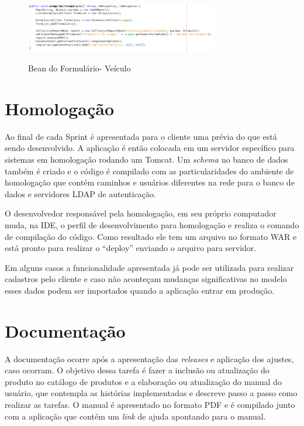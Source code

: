 \begin{figure}[!htb]
    \centering
    \caption{Bean do Formulário- Veículo}
    \includegraphics[width=0.75\textwidth]{dados/figuras/veiculos-jasperreports.png}
    \label{fig:figura-jasperreports}
\end{figure}


\section{Homologação}
\label{sec:atividadesRealizadasHomologacao}

Ao final de cada Sprint é apresentada para o cliente uma prévia do que está sendo desenvolvido. A aplicação é então colocada em um servidor específico para sistemas em homologação rodando um Tomcat. Um \textit{schema} no banco de dados também é criado e o código é compilado com as particularidades do ambiente de homologação que contém caminhos e usuários diferentes na rede para o banco de dados e servidores LDAP de autenticação. 

O desenvolvedor responsável pela homologação, em seu próprio computador muda, na IDE, o perfil de desenvolvimento para homologação e realiza o comando de compilação do código. Como resultado ele tem um arquivo no formato WAR e está pronto para realizar o ``deploy'' enviando o arquivo para servidor.

Em alguns casos a funcionalidade apresentada já pode ser utilizada para realizar cadastros pelo cliente e caso não aconteçam mudanças significativas no modelo esses dados podem ser importados quando a aplicação entrar em produção. 



\section{Documentação}
\label{sec:atividadesRealizadasDocumentacao}

A documentação ocorre após a apresentação das \textit{releases} e aplicação dos ajustes, caso ocorram. O objetivo dessa tarefa é fazer a inclusão ou atualização do produto no catálogo de  produtos e a elaboração ou atualização do manual do usuário, que contempla as histórias implementadas e descreve passo a passo como realizar as tarefas. O manual é apresentado no formato PDF e é compilado junto com a aplicação que contém um \textit{link} de ajuda apontando para o manual.


